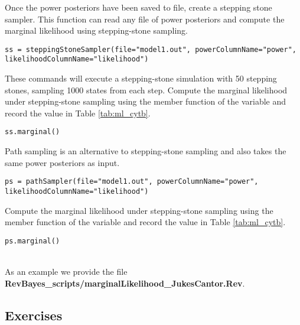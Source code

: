 Once the power posteriors have been saved to file, create a stepping stone sampler. 
This function can read any file of power posteriors and compute the marginal likelihood using stepping-stone sampling. 
{\tt \small \begin{snugshade*}
\begin{lstlisting}
ss = steppingStoneSampler(file="model1.out", powerColumnName="power", likelihoodColumnName="likelihood")
\end{lstlisting}
\end{snugshade*}}

These commands will execute a stepping-stone simulation with 50 stepping stones, sampling 1000 states from each step. 
Compute the marginal likelihood under stepping-stone sampling using the member function  of the  variable and record the value in Table \ref{tab:ml_cytb}.
{\tt \begin{snugshade*}
\begin{lstlisting}
ss.marginal() 
\end{lstlisting}
\end{snugshade*}}

Path sampling is an alternative to stepping-stone sampling and also takes the same power posteriors as input. 
{\tt \small \begin{snugshade*}
\begin{lstlisting}
ps = pathSampler(file="model1.out", powerColumnName="power", likelihoodColumnName="likelihood")
\end{lstlisting}
\end{snugshade*}}

Compute the marginal likelihood under stepping-stone sampling using the member function  of the  variable and record the value in Table \ref{tab:ml_cytb}.
{\tt \begin{snugshade*}
\begin{lstlisting}
ps.marginal() 
\end{lstlisting}
\end{snugshade*}}

\noindent \\ \impmark As an example we provide the file \textbf{RevBayes\_scripts/marginalLikelihood\_JukesCantor.Rev}.


\subsection{Exercises}

